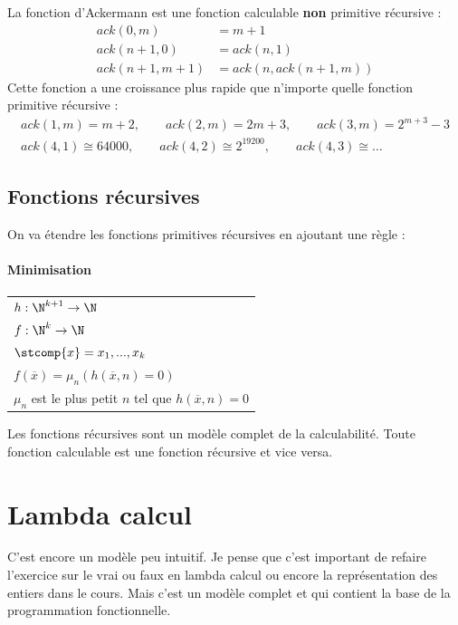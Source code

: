 \begin{myexem}
	La fonction d'Ackermann est une fonction calculable \textbf{non}
	primitive récursive :
	\begin{align*}
		ack(0,m) &= m+1 \\
		ack(n+1,0) &= ack(n,1)\\
		ack(n+1,m+1) &= ack(n, ack(n+1,m))
	\end{align*}
	Cette fonction a une croissance plus rapide que n'importe quelle fonction
	primitive récursive :
    \begin{align*}
    ack(1,m) = m+2,\qquad ack(2,m) = 2m+3,\qquad ack(3,m)=2^{m+3}-3\\
	ack(4,1) \cong 64 000,\qquad ack(4,2) \cong 2^{19200},\qquad ack(4,3) \cong \dots
    \end{align*}
\end{myexem}


\subsection{Fonctions récursives}
\label{ssub:fonctions_r_cursives}
On va étendre les fonctions primitives récursives en ajoutant une règle :

\paragraph{Minimisation}
\begin{tabular}{|l|}
	\hline
	$h: \N^{k+1} \rightarrow \N$\\
	$f: \N^{k} \rightarrow \N$\\
	$\stcomp{x} =x_1,...,x_k$ \\
	$f(\overline{x}) = \mu_n (h(\overline{x}, n) = 0)$\\
	$\mu_n$ est le plus petit $n$ tel que $h(\overline{x}, n) = 0$ \\
	\hline
\end{tabular}

\begin{myprop}
	Les fonctions récursives sont un modèle complet de la calculabilité.
	Toute fonction calculable est une fonction récursive et vice versa.
\end{myprop}

\section{Lambda calcul}
\label{sub:lambda_calcul}
\begin{myrem}%
	C'est encore un modèle peu intuitif. Je pense que c'est important
	de refaire l'exercice sur le vrai ou faux en lambda calcul ou encore la
	représentation des entiers dans le cours. Mais c'est un modèle complet
	et qui contient la base de la programmation fonctionnelle.
\end{myrem}

